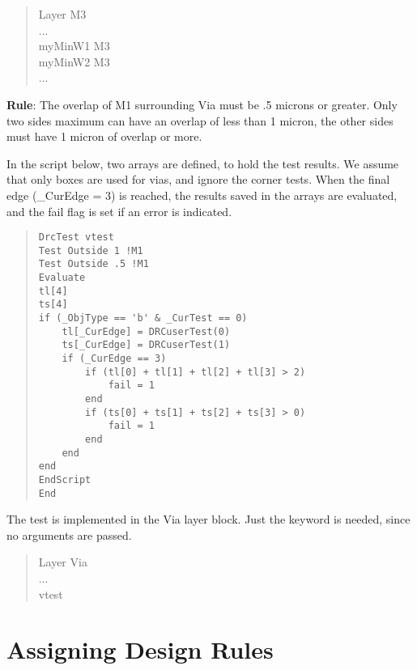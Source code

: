 \begin{quote}\rr\vt
Layer M3\\
...\\
myMinW1 M3\\
myMinW2 M3\\
...\\
\end{quote}

\begin{description}
\item{{\bf Rule}:  The overlap of M1 surrounding Via must be .5 microns or
greater.  Only two sides maximum can have an overlap of less than 1
micron, the other sides must have 1 micron of overlap or more.}
\end{description}

In the script below, two arrays are defined, to hold the test results. 
We assume that only boxes are used for vias, and ignore the corner
tests.  When the final edge (\_CurEdge = 3) is reached, the results
saved in the arrays are evaluated, and the fail flag is set if an
error is indicated.

\begin{quote}
\begin{verbatim}
DrcTest vtest
Test Outside 1 !M1
Test Outside .5 !M1
Evaluate
tl[4]
ts[4]
if (_ObjType == 'b' & _CurTest == 0)
    tl[_CurEdge] = DRCuserTest(0)
    ts[_CurEdge] = DRCuserTest(1)
    if (_CurEdge == 3)
        if (tl[0] + tl[1] + tl[2] + tl[3] > 2)
            fail = 1
        end
        if (ts[0] + ts[1] + ts[2] + ts[3] > 0)
            fail = 1
        end
    end
end
EndScript
End
\end{verbatim}
\end{quote}

The test is implemented in the Via layer block.  Just the keyword is
needed, since no arguments are passed.

\begin{quote}\rr\vt
Layer Via\\
...\\
vtest\\
\end{quote}


\section{Assigning Design Rules}

